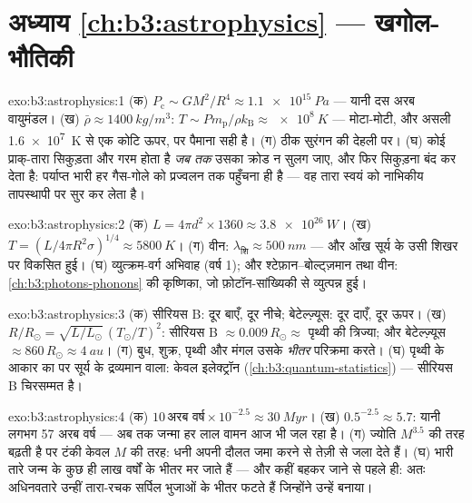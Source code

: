 \section*{अध्याय \ref{ch:b3:astrophysics} --- खगोल-भौतिकी}

\begin{solution}{exo:b3:astrophysics:1}
(क) $P_{\text{c}} \sim GM^2/R^4 \approx \qty{1.1e15}{Pa}$ --- यानी
दस अरब वायुमंडल। (ख) $\bar\rho \approx \qty{1400}{kg/m^3}$:
$T \sim P m_{\text{p}}/\rho k_{\text{B}} \approx \qty{e8}{K}$ ---
मोटा-मोटी, और असली \qty{1.6e7}{K} से एक कोटि ऊपर, पर पैमाना
सही है। (ग) ठीक सुरंगन की देहली पर। (घ) कोई प्राक्-तारा
सिकुड़ता और गरम होता है \emph{जब तक} उसका क्रोड न सुलग जाए, और फिर
सिकुड़ना बंद कर देता है: पर्याप्त भारी हर गैस-गोले को प्रज्वलन तक
पहुँचना ही है --- वह तारा स्वयं को नाभिकीय तापस्थापी पर सुर कर लेता है।
\end{solution}

\begin{solution}{exo:b3:astrophysics:2}
(क) $L = 4\pi d^2\times1360 \approx \qty{3.8e26}{W}$। (ख) $T =
(L/4\pi R^2\sigma)^{1/4} \approx \qty{5800}{K}$। (ग) वीन:
$\lambda_{\text{शि}} \approx \qty{500}{nm}$ --- और आँख
सूर्य के उसी शिखर पर विकसित हुई। (घ) व्युत्क्रम-वर्ग अभिवाह (वर्ष 1);
और श्टेफ़ान--बोल्ट्ज़मान तथा वीन: \cref{ch:b3:photons-phonons} की
कृष्णिका, जो फ़ोटॉन-सांख्यिकी से व्युत्पन्न हुई।
\end{solution}

\begin{solution}{exo:b3:astrophysics:3}
(क) सीरियस B: दूर बाएँ, दूर नीचे; बेटेल्ज़्यूस: दूर दाएँ, दूर ऊपर।
(ख) $R/R_\odot = \sqrt{L/L_\odot}\,(T_\odot/T)^2$: सीरियस B
$\approx 0.009\,R_\odot \approx$ पृथ्वी की त्रिज्या; और बेटेल्ज़्यूस
$\approx 860\,R_\odot \approx \qty{4}{au}$। (ग) बुध, शुक्र,
पृथ्वी और मंगल उसके \emph{भीतर} परिक्रमा करते। (घ) पृथ्वी के आकार का
पर सूर्य के द्रव्यमान वाला: केवल इलेक्ट्रॉन 
(\cref{ch:b3:quantum-statistics}) --- सीरियस B चिरसम्मत
 है।
\end{solution}

\begin{solution}{exo:b3:astrophysics:4}
(क) $10\,\text{अरब वर्ष}\times10^{-2.5} \approx \qty{30}{Myr}$। (ख)
$0.5^{-2.5} \approx 5.7$: यानी लगभग 57 अरब वर्ष --- अब तक जन्मा हर लाल
वामन आज भी जल रहा है। (ग) ज्योति $M^{3.5}$ की तरह बढ़ती है
पर टंकी केवल $M$ की तरह: धनी अपनी दौलत जमा करने से तेज़ी से
जला देते हैं। (घ) भारी तारे जन्म के कुछ ही लाख वर्षों के भीतर मर
जाते हैं --- और कहीं बहकर जाने से पहले ही: अतः अधिनवतारे उन्हीं
तारा-रचक सर्पिल भुजाओं के भीतर फटते हैं जिन्होंने उन्हें बनाया।
\end{solution}

